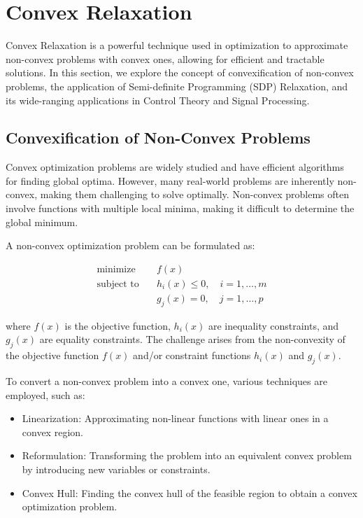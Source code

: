 \documentclass[12pt]{book} %
\begin{document}
\section{Convex Relaxation}

Convex Relaxation is a powerful technique used in optimization to approximate non-convex problems with convex ones, allowing for efficient and tractable solutions. In this section, we explore the concept of convexification of non-convex problems, the application of Semi-definite Programming (SDP) Relaxation, and its wide-ranging applications in Control Theory and Signal Processing.

\subsection{Convexification of Non-Convex Problems}

Convex optimization problems are widely studied and have efficient algorithms for finding global optima. However, many real-world problems are inherently non-convex, making them challenging to solve optimally. Non-convex problems often involve functions with multiple local minima, making it difficult to determine the global minimum.

A non-convex optimization problem can be formulated as:

\begin{align*}
\text{minimize} \quad & f(x) \\
\text{subject to} \quad & h_i(x) \leq 0, \quad i = 1, \ldots, m \\
& g_j(x) = 0, \quad j = 1, \ldots, p
\end{align*}

where \(f(x)\) is the objective function, \(h_i(x)\) are inequality constraints, and \(g_j(x)\) are equality constraints. The challenge arises from the non-convexity of the objective function \(f(x)\) and/or constraint functions \(h_i(x)\) and \(g_j(x)\).

To convert a non-convex problem into a convex one, various techniques are employed, such as:

\begin{itemize}
    \item Linearization: Approximating non-linear functions with linear ones in a convex region.
    \item Reformulation: Transforming the problem into an equivalent convex problem by introducing new variables or constraints.
    \item Convex Hull: Finding the convex hull of the feasible region to obtain a convex optimization problem.
\end{itemize}
\end{document}
